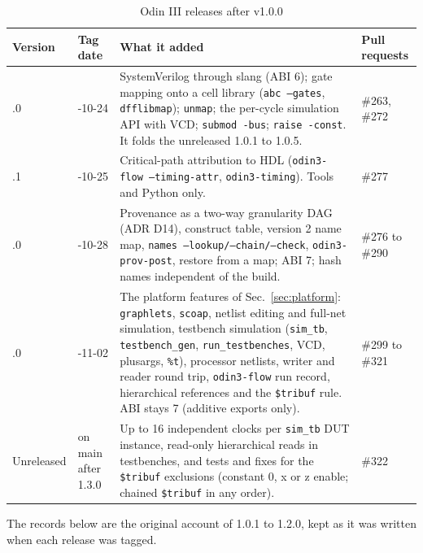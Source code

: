 \documentclass[conference]{IEEEtran}
\newcommand{\code}[1]{\texttt{#1}}
\begin{document}
\begin{table}[!tp]
\caption{Odin III releases after v1.0.0}
\label{tab:releases}
\centering
\footnotesize
\begin{tabular}{@{}>{\raggedright\arraybackslash}p{}%
  >{\raggedright\arraybackslash}p{}%
  >{\raggedright\arraybackslash}p{}%
  >{\raggedright\arraybackslash}p{}@{}}
\toprule
Version & Tag date & What it added & Pull requests \\
\midrule
1.1.0 & 2026-10-24 & SystemVerilog through slang (ABI 6); gate mapping onto a cell library (\code{abc --gates},
  \code{dfflibmap}); \code{unmap}; the per-cycle simulation API with VCD; \code{submod -bus}; \code{raise -const}.
  It folds the unreleased 1.0.1 to 1.0.5. & \#263, \#272 \\
1.1.1 & 2026-10-25 & Critical-path attribution to HDL (\code{odin3-flow --timing-attr}, \code{odin3-timing}).
  Tools and Python only. & \#277 \\
1.2.0 & 2026-10-28 & Provenance as a two-way granularity DAG (ADR D14), construct table, version 2 name map,
  \code{names --lookup/--chain/--check}, \code{odin3-prov-post}, restore from a map; ABI 7; hash names independent of the build.
  & \#276 to \#290 \\
1.3.0 & 2026-11-02 & The platform features of Sec.~\ref{sec:platform}: \code{graphlets}, \code{scoap}, netlist editing and
  full-net simulation, testbench simulation (\code{sim\_tb}, \code{testbench\_gen}, \code{run\_testbenches}, VCD, plusargs, \code{\%t}),
  processor netlists, writer and reader round trip, \code{odin3-flow} run record, hierarchical references and the
  \code{\$tribuf} rule. ABI stays 7 (additive exports only). & \#299 to \#321 \\
Unreleased & on main after 1.3.0 & Up to 16 independent clocks per \code{sim\_tb} DUT instance, read-only hierarchical reads in testbenches, and tests and fixes for the \code{\$tribuf} exclusions (constant 0, x or z enable; chained \code{\$tribuf} in any order). & \#322 \\
\bottomrule
\end{tabular}
\end{table}

The records below are the original account of 1.0.1 to 1.2.0, kept as it was written when each release was
tagged.
\end{document}
